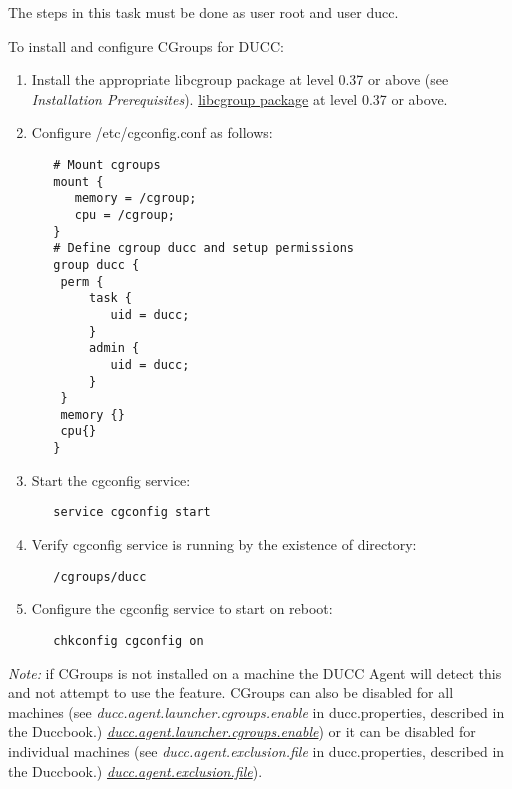     The steps in this task must be done as user root and user ducc.

    To install and configure CGroups for DUCC:
    \begin{enumerate}
       \item Install the appropriate 
   \ifdefined\DUCCSTANDALONE
   libcgroup package at level 0.37 or above (see {\em Installation Prerequisites}).
   \else
   \hyperref[sec:install.prerequisites]{libcgroup package} at level 0.37 or above.
   \fi

       \item Configure /etc/cgconfig.conf as follows:
\begin{verbatim}
   # Mount cgroups
   mount {
      memory = /cgroup;
      cpu = /cgroup;
   }
   # Define cgroup ducc and setup permissions
   group ducc {
    perm {
        task {
           uid = ducc;
        }
        admin {
           uid = ducc;
        }
    }
    memory {}
    cpu{}
   }
\end{verbatim}
       \item Start the cgconfig service:
\begin{verbatim}
   service cgconfig start
\end{verbatim}
         
       \item Verify cgconfig service is running by the existence of directory: 
\begin{verbatim}
   /cgroups/ducc
\end{verbatim}

       \item Configure the cgconfig service to start on reboot:
\begin{verbatim}
   chkconfig cgconfig on
\end{verbatim}
    \end{enumerate}

{\em Note:} if CGroups is not installed on a machine the DUCC Agent will detect this and not 
  	attempt to use the feature. CGroups can also be disabled for all machines
   	(see 
   \ifdefined\DUCCSTANDALONE
   {\em ducc.agent.launcher.cgroups.enable} in ducc.properties, described in the Duccbook.)
   \else
   \hyperref[itm:props-agent.cgroups.enable] {\em ducc.agent.launcher.cgroups.enable}) 
   \fi
   	or it can be disabled for individual machines (see 
   \ifdefined\DUCCSTANDALONE
   {\em ducc.agent.exclusion.file} in ducc.properties, described in the Duccbook.)
   \else
   \hyperref[itm:props-agent.cgroups.exclusion]{\em ducc.agent.exclusion.file}).
   \fi


